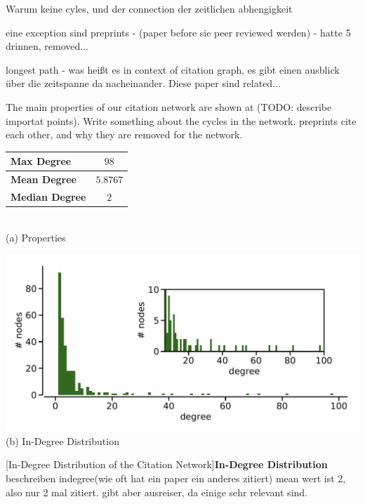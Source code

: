 Warum keine cyles, und der connection der zeitlichen abhengigkeit

eine exception sind preprints - (paper before sie peer reviewed werden) - hatte 5 drinnen, removed...

longest path - was heißt es in context of citation graph, es gibt einen ausblick über die zeitspanne da nacheinander. Diese paper sind related...

The main properties of our citation network are shown at (TODO: describe importat points).
Write something about the cycles in the network. preprints cite each other, and why they are removed for the network.
\begin{minipage}[!t]{\textwidth}
  \begin{minipage}[b]{0.39\textwidth}
    \centering
    \begin{tabular}{ l c }
      \toprule
      \textbf{Max Degree}    & $98$     \\ \midrule
      \textbf{Mean Degree}   & $5.8767$ \\ \midrule
      \textbf{Median Degree} & $2$      \\
      \bottomrule
  \end{tabular} \\
  \vspace*{1cm}
  (a) Properties
\end{minipage}
\begin{minipage}[b]{0.59\textwidth}
  \centering
  \includegraphics[width=1.0\textwidth]{figures/in-degree_distribution} \\
  (b) In-Degree Distribution
  \end{minipage}
  [In-Degree Distribution of the Citation Network]{\textbf{In-Degree Distribution} beschreiben indegree(wie oft hat ein paper ein anderes zitiert) mean wert ist 2, also nur 2 mal zitiert. gibt aber ausreiser, da einige sehr relevant sind.}
  \label{fig:indegree_distribution}
\end{minipage}

